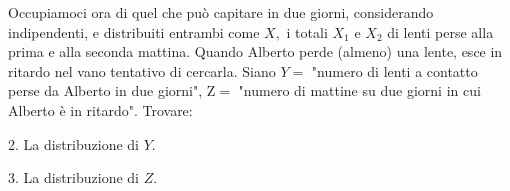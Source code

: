 Occupiamoci ora di quel che può capitare in due giorni, considerando indipendenti, e distribuiti entrambi come $X,$ i totali $X_{1}$ e $X_{2}$ di lenti perse alla prima e alla seconda mattina. Quando Alberto perde (almeno) una lente, esce in ritardo nel vano tentativo di cercarla. Siano $Y=$ "numero di lenti a contatto perse da Alberto in due giorni", $\mathrm{Z} =$ "numero di mattine su due giorni in cui Alberto è in ritardo". Trovare:

2. La distribuzione di $Y$.

3. La distribuzione di $Z$.
